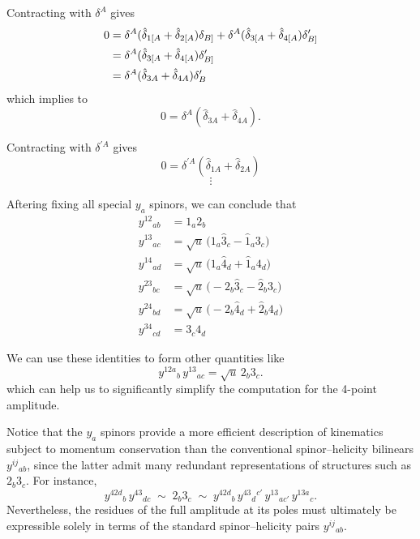 \documentclass[12pt]{article}
\begin{document}
Contracting with $\delta^A$ gives 
\begin{align}
    0&=\delta^A(\hat{\delta}_{1[A}+\hat{\delta}_{2[A})\delta_{B]}+\delta^A(\hat{\delta}_{3[A}+\hat{\delta}_{4[A})\delta^\prime_{B]}\notag\\
    &=\delta^A(\hat{\delta}_{3[A}+\hat{\delta}_{4[A})\delta^\prime_{B]}\notag\\
    &=\delta^A(\hat{\delta}_{3A}+\hat{\delta}_{4A})\delta^\prime_{B}
\end{align}
which implies to
\begin{equation}
    0=\delta^A(\hat{\delta}_{3A}+\hat{\delta}_{4A}).
\end{equation}

Contracting with $\delta^{\prime A}$ gives 
\begin{equation}
    0=\delta^{\prime A}(\hat{\delta}_{1A}+\hat{\delta}_{2A})
\end{equation}
\begin{equation}
    \vdots 
\end{equation}

Aftering fixing all special $y_a$ spinors, we can conclude that
\begin{align}
    y^{12}{}_{ab} &= 1_a 2_b \\
    y^{13}{}_{ac} &= \sqrt{u}\,\bigl(1_a \hat{3}_c - \hat{1}_a 3_c\bigr) \\
    y^{14}{}_{ad} &= \sqrt{u}\,\bigl(1_a \hat{4}_d + \hat{1}_a 4_d\bigr) \\
    y^{23}{}_{bc} &= \sqrt{u}\,\bigl(-2_b \hat{3}_c - \hat{2}_b 3_c\bigr) \\
    y^{24}{}_{bd} &= \sqrt{u}\,\bigl(-2_b \hat{4}_d + \hat{2}_b 4_d\bigr) \\
    y^{34}{}_{cd} &= 3_c 4_d
\end{align}

We can use these identities to form other quantities like
\begin{equation}
    y^{12a}{}_{b}\,y^{13}{}_{ac} = \sqrt{u}\,2_b 3_c .
\end{equation}
which can help us to significantly simplify the computation for the 4-point amplitude.

Notice that the $y_a$ spinors provide a more efficient description of kinematics subject to momentum conservation than the conventional spinor--helicity bilinears $y^{ij}{}_{ab}$, since the latter admit many redundant representations of structures such as $2_b 3_c$. 
For instance,
\begin{equation}
y^{42d}{}_{b}\,y^{43}{}_{dc}
\;\sim\; 2_b 3_c
\;\sim\;
y^{42d}{}_{b}\,y^{43}{}_{d}{}^{c'}\,y^{13}{}_{ac'}\,y^{13a}{}_{c}.
\end{equation}
Nevertheless, the residues of the full amplitude at its poles must ultimately be expressible solely in terms of the standard spinor--helicity pairs $y^{ij}{}_{ab}$.
\end{document}
